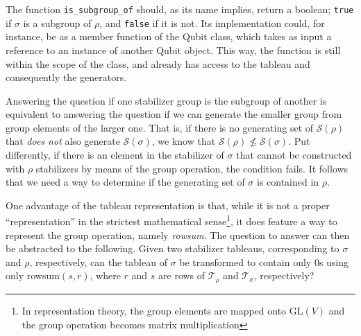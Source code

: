 The function \verb|is_subgroup_of| should, as its name implies, return a
boolean; \verb|true| if $\sigma$ is a subgroup of $\rho$, and \verb|false| if
it is not. Its implementation could, for instance, be as a member function of
the Qubit class, which takes as input a reference to an instance of another Qubit
object. This way, the function is still within the scope of the class,
and already has access to the tableau and consequently the generators. 

Answering the question if one stabilizer group is the subgroup of another is
equivalent to answering the question if we can generate the smaller group from
group elements of the larger one. That is, if there is no generating set of
$\mathcal{S}(\rho)$ that \emph{does not} also generate $\mathcal{S}(\sigma)$, we know that
$\mathcal{S}(\rho)\not\leq\mathcal{S}(\sigma)$. Put differently, if there is an element in
the stabilizer of $\sigma$ that cannot be constructed with $\rho$ stabilizers
by means of the group operation, the condition fails.
It follows that we need a way to determine if the generating set of $\sigma$ is
contained in $\rho$.

One advantage of the tableau representation is that, while it is not a proper
\enquote{representation} in the strictest mathematical sense\footnote{In
representation theory, the group elements are mapped onto GL$(V)$ and the group
operation becomes matrix multiplication}, it does feature a way to represent
the group operation, namely \emph{rowsum}. The question to answer can then be
abstracted to the following. Given two stabilizer tableaus, corresponding to
$\sigma$ and $\rho$, respectively, can the tableau of $\sigma$ be transformed
to contain only $0$s using only rowsum$(s,r)$, where $r$ and $s$ are rows of
$\mathcal{T}_\rho$ and $\mathcal{T}_\sigma$, respectively?

